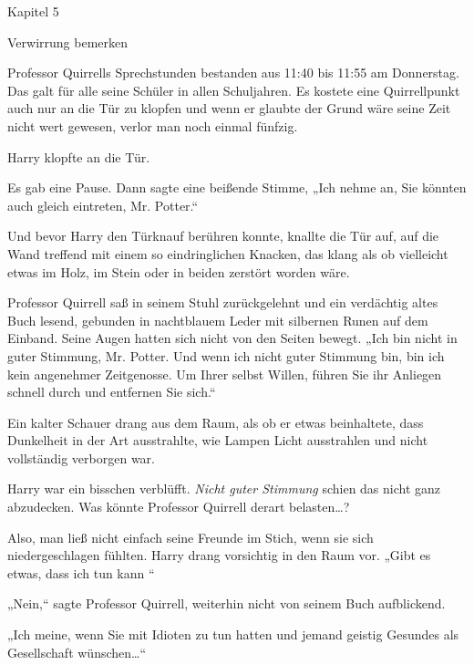 

\hypertarget{verwirrung-bemerken}{%

Kapitel 5

Verwirrung bemerken

Professor Quirrells Sprechstunden bestanden aus 11:40 bis 11:55 am Donnerstag. Das galt für alle seine Schüler in allen Schuljahren. Es kostete eine Quirrellpunkt auch nur an die Tür zu klopfen und wenn er glaubte der Grund wäre seine Zeit nicht wert gewesen, verlor man noch einmal fünfzig.

Harry klopfte an die Tür.

Es gab eine Pause. Dann sagte eine beißende Stimme, „Ich nehme an, Sie könnten auch gleich eintreten, Mr. Potter.“

Und bevor Harry den Türknauf berühren konnte, knallte die Tür auf, auf die Wand treffend mit einem so eindringlichen Knacken, das klang als ob vielleicht etwas im Holz, im Stein oder in beiden zerstört worden wäre.

Professor Quirrell saß in seinem Stuhl zurückgelehnt und ein verdächtig altes Buch lesend, gebunden in nachtblauem Leder mit silbernen Runen auf dem Einband. Seine Augen hatten sich nicht von den Seiten bewegt. „Ich bin nicht in guter Stimmung, Mr. Potter. Und wenn ich nicht guter Stimmung bin, bin ich kein angenehmer Zeitgenosse. Um Ihrer selbst Willen, führen Sie ihr Anliegen schnell durch und entfernen Sie sich.“

Ein kalter Schauer drang aus dem Raum, als ob er etwas beinhaltete, dass Dunkelheit in der Art ausstrahlte, wie Lampen Licht ausstrahlen und nicht vollständig verborgen war.

Harry war ein bisschen verblüfft. \emph{Nicht guter Stimmung} schien das nicht ganz abzudecken. Was könnte Professor Quirrell derart belasten…?

Also, man ließ nicht einfach seine Freunde im Stich, wenn sie sich niedergeschlagen fühlten. Harry drang vorsichtig in den Raum vor. „Gibt es etwas, dass ich tun kann \later“

„Nein,“ sagte Professor Quirrell, weiterhin nicht von seinem Buch aufblickend.

„Ich meine, wenn Sie mit Idioten zu tun hatten und jemand geistig Gesundes als Gesellschaft wünschen…“

}
